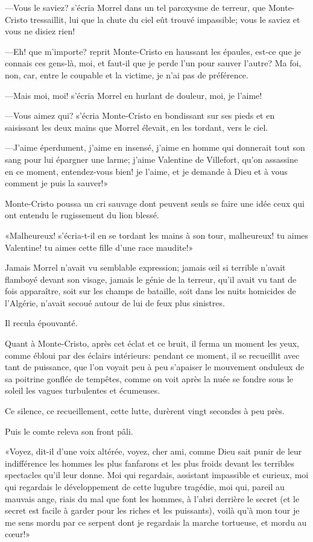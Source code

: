 —Vous le saviez? s'écria Morrel dans un tel paroxysme de terreur, que Monte-Cristo tressaillit, lui que la chute du ciel eût trouvé impassible; vous le saviez et vous ne disiez rien! 

—Eh! que m'importe? reprit Monte-Cristo en haussant les épaules, est-ce que je connais ces gens-là, moi, et faut-il que je perde l'un pour sauver l'autre? Ma foi, non, car, entre le coupable et la victime, je n'ai pas de préférence. 

—Mais moi, moi! s'écria Morrel en hurlant de douleur, moi, je l'aime! 

—Vous aimez qui? s'écria Monte-Cristo en bondissant sur ses pieds et en saisissant les deux mains que Morrel élevait, en les tordant, vers le ciel. 

—J'aime éperdument, j'aime en insensé, j'aime en homme qui donnerait tout son sang pour lui épargner une larme; j'aime Valentine de Villefort, qu'on assassine en ce moment, entendez-vous bien! je l'aime, et je demande à Dieu et à vous comment je puis la sauver!» 

Monte-Cristo poussa un cri sauvage dont peuvent seuls se faire une idée ceux qui ont entendu le rugissement du lion blessé. 

«Malheureux! s'écria-t-il en se tordant les mains à son tour, malheureux! tu aimes Valentine! tu aimes cette fille d'une race maudite!» 

Jamais Morrel n'avait vu semblable expression; jamais œil si terrible n'avait flamboyé devant son visage, jamais le génie de la terreur, qu'il avait vu tant de fois apparaître, soit sur les champs de bataille, soit dans les nuits homicides de l'Algérie, n'avait secoué autour de lui de feux plus sinistres. 

Il recula épouvanté. 

Quant à Monte-Cristo, après cet éclat et ce bruit, il ferma un moment les yeux, comme ébloui par des éclairs intérieurs: pendant ce moment, il se recueillit avec tant de puissance, que l'on voyait peu à peu s'apaiser le mouvement onduleux de sa poitrine gonflée de tempêtes, comme on voit après la nuée se fondre sous le soleil les vagues turbulentes et écumeuses. 

Ce silence, ce recueillement, cette lutte, durèrent vingt secondes à peu près. 

Puis le comte releva son front pâli. 

«Voyez, dit-il d'une voix altérée, voyez, cher ami, comme Dieu sait punir de leur indifférence les hommes les plus fanfarons et les plus froids devant les terribles spectacles qu'il leur donne. Moi qui regardais, assistant impassible et curieux, moi qui regardais le développement de cette lugubre tragédie, moi qui, pareil au mauvais ange, riais du mal que font les hommes, à l'abri derrière le secret (et le secret est facile à garder pour les riches et les puissants), voilà qu'à mon tour je me sens mordu par ce serpent dont je regardais la marche tortueuse, et mordu au cœur!» 


